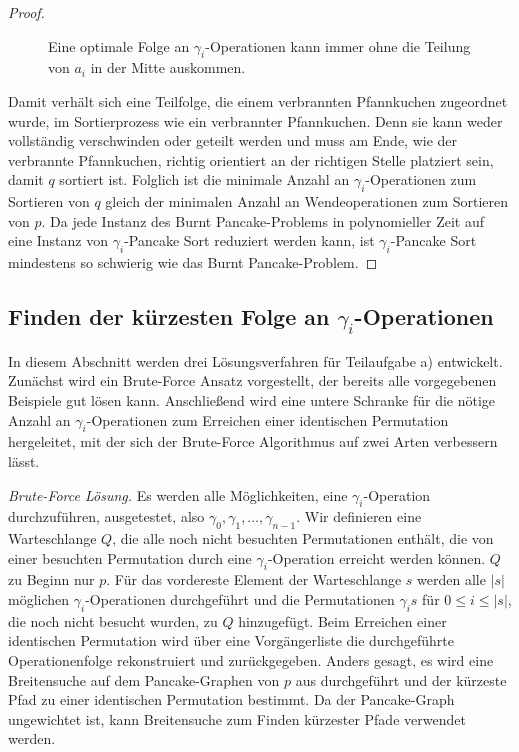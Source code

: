 \documentclass[a4paper, 10pt, ngerman]{article}
\begin{document}
\begin{proof}
    \begin{figure}[H]
        \centering
        \caption{Eine optimale Folge an $\gamma_i$-Operationen kann immer ohne die Teilung von $a_i$ in der Mitte auskommen.}
    \end{figure}

    Damit verhält sich eine Teilfolge, die einem verbrannten Pfannkuchen zugeordnet wurde, im Sortierprozess wie ein verbrannter Pfannkuchen. Denn sie kann weder vollständig verschwinden oder geteilt werden und muss am Ende, wie der verbrannte Pfannkuchen, richtig orientiert an der richtigen Stelle platziert sein, damit $q$ sortiert ist. Folglich ist die minimale Anzahl an $\gamma_i$-Operationen zum Sortieren von $q$ gleich der minimalen Anzahl an Wendeoperationen zum Sortieren von $p$. Da jede Instanz des Burnt Pancake-Problems in polynomieller Zeit auf eine Instanz von $\gamma_i$-Pancake Sort reduziert werden kann, ist $\gamma_i$-Pancake Sort mindestens so schwierig wie das Burnt Pancake-Problem.
\end{proof}

\subsection{Finden der kürzesten Folge an $\gamma_i$-Operationen}

In diesem Abschnitt werden drei Lösungsverfahren für Teilaufgabe a) entwickelt. Zunächst wird ein Brute-Force Ansatz vorgestellt, der bereits alle vorgegebenen Beispiele gut lösen kann. Anschließend wird eine untere Schranke für die nötige Anzahl an $\gamma_i$-Operationen zum Erreichen einer identischen Permutation hergeleitet, mit der sich der Brute-Force Algorithmus auf zwei Arten verbessern lässt.
\medskip

\emph{Brute-Force Lösung.} Es werden alle Möglichkeiten, eine $\gamma_i$-Operation durchzuführen, ausgetestet, also $\gamma_0, \gamma_1, \dots, \gamma_{n-1}$. Wir definieren eine Warteschlange $Q$, die alle noch nicht besuchten Permutationen enthält, die von einer besuchten Permutation durch eine $\gamma_i$-Operation erreicht werden können. $Q$ zu Beginn nur $p$. Für das vordereste Element der Warteschlange $s$ werden alle $|s|$ möglichen $\gamma_i$-Operationen durchgeführt und die Permutationen $\gamma_i s$ für $0 \le i \le |s|$, die noch nicht besucht wurden, zu $Q$ hinzugefügt. Beim Erreichen einer identischen Permutation wird über eine Vorgängerliste die durchgeführte Operationenfolge rekonstruiert und zurückgegeben. Anders gesagt, es wird eine Breitensuche auf dem Pancake-Graphen von $p$ aus durchgeführt und der kürzeste Pfad zu einer identischen Permutation bestimmt. Da der Pancake-Graph ungewichtet ist, kann Breitensuche zum Finden kürzester Pfade verwendet werden.
\end{document}
